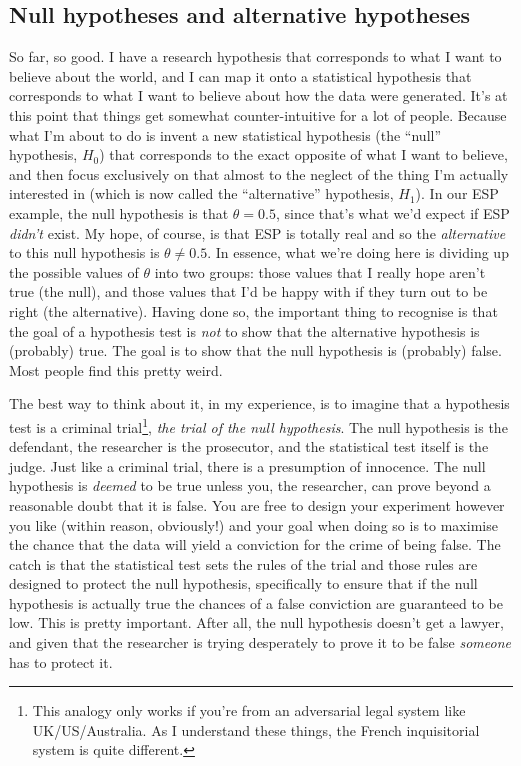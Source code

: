 \documentclass[
]{book}
\begin{document}
\hypertarget{null-hypotheses-and-alternative-hypotheses}{%
\subsection{Null hypotheses and alternative hypotheses}\label{null-hypotheses-and-alternative-hypotheses}}

So far, so good. I have a research hypothesis that corresponds to what I want to believe about the world, and I can map it onto a statistical hypothesis that corresponds to what I want to believe about how the data were generated. It's at this point that things get somewhat counter-intuitive for a lot of people. Because what I'm about to do is invent a new statistical hypothesis (the ``null'' hypothesis, \(H_0\)) that corresponds to the exact opposite of what I want to believe, and then focus exclusively on that almost to the neglect of the thing I'm actually interested in (which is now called the ``alternative'' hypothesis, \(H_1\)). In our ESP example, the null hypothesis is that \(\theta = 0.5\), since that's what we'd expect if ESP \emph{didn't} exist. My hope, of course, is that ESP is totally real and so the \emph{alternative} to this null hypothesis is \(\theta \neq 0.5\). In essence, what we're doing here is dividing up the possible values of \(\theta\) into two groups: those values that I really hope aren't true (the null), and those values that I'd be happy with if they turn out to be right (the alternative). Having done so, the important thing to recognise is that the goal of a hypothesis test is \emph{not} to show that the alternative hypothesis is (probably) true. The goal is to show that the null hypothesis is (probably) false. Most people find this pretty weird.

The best way to think about it, in my experience, is to imagine that a hypothesis test is a criminal trial\footnote{This analogy only works if you're from an adversarial legal system like UK/US/Australia. As I understand these things, the French inquisitorial system is quite different.}, \emph{the trial of the null hypothesis}. The null hypothesis is the defendant, the researcher is the prosecutor, and the statistical test itself is the judge. Just like a criminal trial, there is a presumption of innocence. The null hypothesis is \emph{deemed} to be true unless you, the researcher, can prove beyond a reasonable doubt that it is false. You are free to design your experiment however you like (within reason, obviously!) and your goal when doing so is to maximise the chance that the data will yield a conviction for the crime of being false. The catch is that the statistical test sets the rules of the trial and those rules are designed to protect the null hypothesis, specifically to ensure that if the null hypothesis is actually true the chances of a false conviction are guaranteed to be low. This is pretty important. After all, the null hypothesis doesn't get a lawyer, and given that the researcher is trying desperately to prove it to be false \emph{someone} has to protect it.
\end{document}
